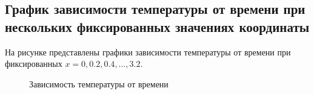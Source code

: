 \sloppy\subsection{График зависимости температуры от времени при нескольких фиксированных значениях координаты}
На рисунке представлены графики зависимости температуры от времени при фиксированных $x = 0, 0.2, 0.4, \ldots, 3.2$.
\begin{figure}[H]
    \caption{Зависимость температуры от времени}
    
\end{figure}

